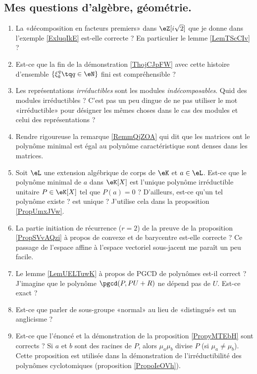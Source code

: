 \subsection{Mes questions d'algèbre, géométrie.}

\begin{enumerate}
    \item
        La «décomposition en facteurs premiers» dans \( \eZ[i\sqrt{2}]\) que je donne dans l'exemple \ref{ExluqIkE} est-elle correcte ? En particulier le lemme \ref{LemTScCIv} ?
    \item
        Est-ce que la fin de la démonstration \ref{ThojCJpFW} avec cette histoire d'ensemble \( \{ \xi_k^q\tq q\in \eN \}\) fini est compréhensible ?
    \item
        Les représentations \emph{irréductibles} sont les modules \emph{indécomposables}. Quid des modules irréductibles ? C'est pas un peu dingue de ne pas utiliser le mot «irréductible» pour désigner les mêmes choses dans le cas des modules et celui des représentations ?
    \item
        Rendre rigoureuse la remarque \eqref{RemmQjZOA} qui dit que les matrices ont le polynôme minimal est égal au polynôme caractéristique sont denses dans les matrices.
    \item
        Soit \( \eL\) une extension algébrique de corps de \( \eK\) et \( a\in \eL\). Est-ce que le polynôme minimal de \( a\) dans \( \eK[X]\) est l'unique polynôme irréductible unitaire \( P\in \eK[X]\) tel que \( P(a)=0\) ? D'ailleurs, est-ce qu'un tel polynôme existe ? est unique ? J'utilise cela dans la proposition \ref{PropUmxJVw}.
    \item
        La partie initiation de récurrence (\( r=2\)) de la preuve de la proposition \ref{PropSVvAQzi} à propos de convexe et de barycentre est-elle correcte ? Ce passage de l'espace affine à l'espace vectoriel sous-jacent me paraît un peu facile.
    \item
        Le lemme \ref{LemUELTuwK} à propos de PGCD de polynômes est-il correct ? J'imagine que le polynôme \( \pgcd(P,PU+R)\) ne dépend pas de \( U\). Est-ce exact ?
    \item
        Est-ce que parler de sous-groupe «normal» au lieu de «distingué» est un anglicisme ?
    \item
        Est-ce que l'énoncé et la démonstration de la proposition \ref{PropyMTEbH} sont corrects ? Si \( a\) et \( b\) sont des racines de \( P\), alors \( \mu_a\mu_b\) divise \( P\) (si \( \mu_a\neq \mu_b\)). Cette proposition est utilisée dans la démonstration de l'irréductibilité des polynômes cyclotomiques (proposition \ref{PropoIeOVh}).

\end{enumerate}
